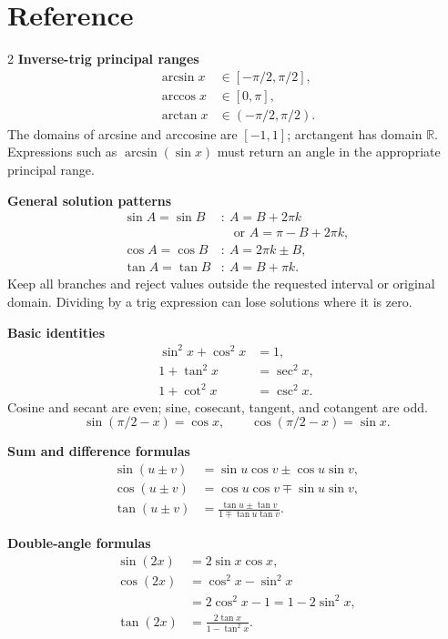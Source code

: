 \documentclass[11pt]{article}
\begin{document}
\section*{Reference}
\begin{multicols}{2}
\small
\textbf{Inverse-trig principal ranges}
\[
\begin{aligned}
  \arcsin x&\in[-\pi/2,\pi/2],\\
  \arccos x&\in[0,\pi],\\
  \arctan x&\in(-\pi/2,\pi/2).
\end{aligned}
\]
The domains of arcsine and arccosine are $[-1,1]$; arctangent has domain
$\mathbb R$. Expressions such as $\arcsin(\sin x)$ must return an angle in
the appropriate principal range.

\medskip
\textbf{General solution patterns}
\[
\begin{aligned}
  \sin A=\sin B&:\ A=B+2\pi k\\
              &\quad\text{or }A=\pi-B+2\pi k,\\
  \cos A=\cos B&:\ A=2\pi k\pm B,\\
  \tan A=\tan B&:\ A=B+\pi k.
\end{aligned}
\]
Keep all branches and reject values outside the requested interval or original
domain. Dividing by a trig expression can lose solutions where it is zero.

\medskip
\textbf{Basic identities}
\[
\begin{aligned}
  \sin^2x+\cos^2x&=1,\\
  1+\tan^2x&=\sec^2x,\\
  1+\cot^2x&=\csc^2x.
\end{aligned}
\]
Cosine and secant are even; sine, cosecant, tangent, and cotangent are odd.
\[
  \sin(\pi/2-x)=\cos x,\qquad
  \cos(\pi/2-x)=\sin x.
\]

\columnbreak
\textbf{Sum and difference formulas}
\[
\begin{aligned}
  \sin(u\pm v)&=\sin u\cos v\pm\cos u\sin v,\\
  \cos(u\pm v)&=\cos u\cos v\mp\sin u\sin v,\\
  \tan(u\pm v)&=\frac{\tan u\pm\tan v}{1\mp\tan u\tan v}.
\end{aligned}
\]

\textbf{Double-angle formulas}
\[
\begin{aligned}
  \sin(2x)&=2\sin x\cos x,\\
  \cos(2x)&=\cos^2x-\sin^2x\\
          &=2\cos^2x-1=1-2\sin^2x,\\
  \tan(2x)&=\frac{2\tan x}{1-\tan^2x}.
\end{aligned}
\]


\end{multicols}
\end{document}
